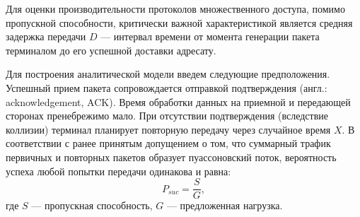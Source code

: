 Для оценки производительности протоколов множественного доступа, помимо пропускной способности, критически важной характеристикой является средняя задержка передачи $D$ — интервал времени от момента генерации пакета терминалом до его успешной доставки адресату.

Для построения аналитической модели введем следующие предположения. Успешный прием пакета сопровождается отправкой подтверждения (англ.: acknowledgement, ACK). Время обработки данных на приемной и передающей сторонах пренебрежимо мало. При отсутствии подтверждения (вследствие коллизии) терминал планирует повторную передачу через случайное время $X$. В соответствии с ранее принятым допущением о том, что суммарный трафик первичных и повторных пакетов образует пуассоновский поток, вероятность успеха любой попытки передачи одинакова и равна:
\[
    P_{suc} = \frac{S}{G},
\]
где $S$ — пропускная способность, $G$ — предложенная нагрузка.

